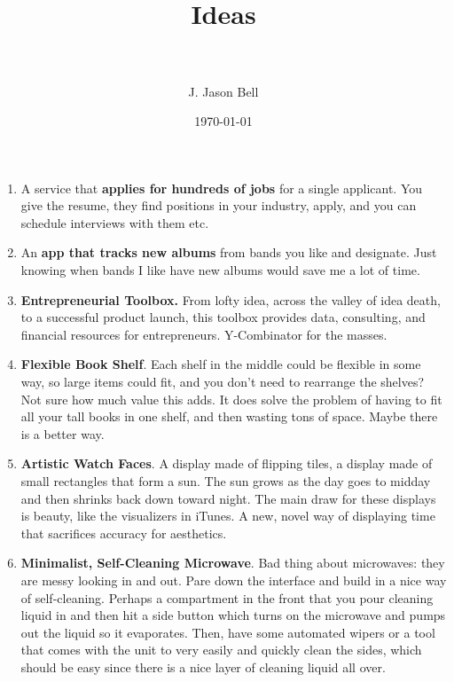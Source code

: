 \documentclass[paper=a4, fontsize=11pt]{scrartcl} %
\title{	
\normalfont \normalsize 
\horrule{0.5pt} \\[0.4cm] %
\huge Ideas \\ %
\horrule{2pt} \\[0.5cm] %
}
\author{J. Jason Bell} %
\date{\normalsize\today} %
\numberwithin{equation}{section} %
\numberwithin{figure}{section} %
\numberwithin{table}{section} %
\begin{document}
\maketitle %




\begin{enumerate}
 

\item A service that \textbf{applies for hundreds of jobs} for a single applicant.  You give the resume, they find positions in your industry, apply, and you can schedule interviews with them etc.  

\item An \textbf{app that tracks new albums} from bands you like and designate.  Just knowing when bands I like have new albums would save me a lot of time. 

\item \textbf{Entrepreneurial Toolbox.}  From lofty idea, across the valley of idea death, to a successful product launch, this toolbox provides data, consulting, and financial resources for entrepreneurs.  Y-Combinator for the masses.  

\item \textbf{Flexible Book Shelf}.  Each shelf in the middle could be flexible in some way, so large items could fit, and you don't need to rearrange the shelves?  Not sure how much value this adds.  It does solve the problem of having to fit all your tall books in one shelf, and then wasting tons of space.  Maybe there is a better way.   

\item \textbf{Artistic Watch Faces}.  A display made of flipping tiles, a display made of small rectangles that form a sun.  The sun grows as the day goes to midday and then shrinks back down toward night.  The main draw for these displays is beauty, like the visualizers in iTunes.  A new, novel way of displaying time that sacrifices accuracy for aesthetics.  

\item \textbf{Minimalist, Self-Cleaning Microwave}.  Bad thing about microwaves: they are messy looking in and out.  Pare down the interface and build in a nice way of self-cleaning.  Perhaps a compartment in the front that you pour cleaning liquid in and then hit a side button which turns on the microwave and pumps out the liquid so it evaporates.  Then, have some automated wipers or a tool that comes with the unit to very easily and quickly clean the sides, which should be easy since there is a nice layer of cleaning liquid all over. 


\end{enumerate}
\end{document}
